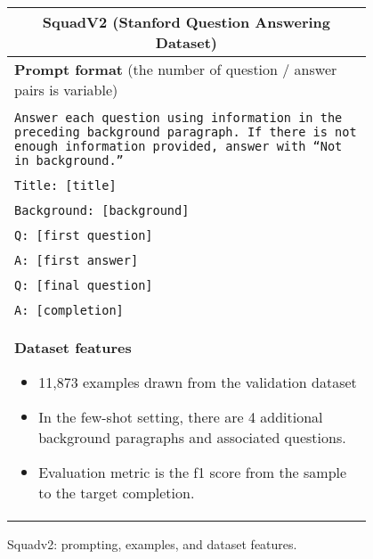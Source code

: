 \begin{figure}[p]
    \centering \small
    \begin{tabular}{p{0.95\linewidth}}
    \toprule
    \multicolumn{1}{c}{\textbf{SquadV2 (Stanford Question Answering Dataset)}} \\

    \midrule
    \textbf{Prompt format} {(the number of question / answer pairs is variable)}\\\\

    \texttt{Answer each question using information in the preceding background paragraph. If there is not enough information provided, answer with ``Not in background.''} \\\\
    \texttt{Title: [title]} \\\\
    \texttt{Background: [background]} \\\\
    \texttt{Q: [first question]} \\\\
    \texttt{A: [first answer]} \\\\
    \texttt{Q: [final question]} \\\\
    \texttt{A: [completion]} \\

    \midrule
    \textbf{Dataset features}
    \begin{itemize}
        \item 11,873 examples drawn from the validation dataset
        \item In the few-shot setting, there are 4 additional background paragraphs and associated questions.
        \item Evaluation metric is the f1 score from the sample to the target completion.
    \end{itemize} \\

    \bottomrule
    \end{tabular}
    \caption{Squadv2: prompting, examples, and dataset features.}
    \label{tab:prompt-squad}
\end{figure}


